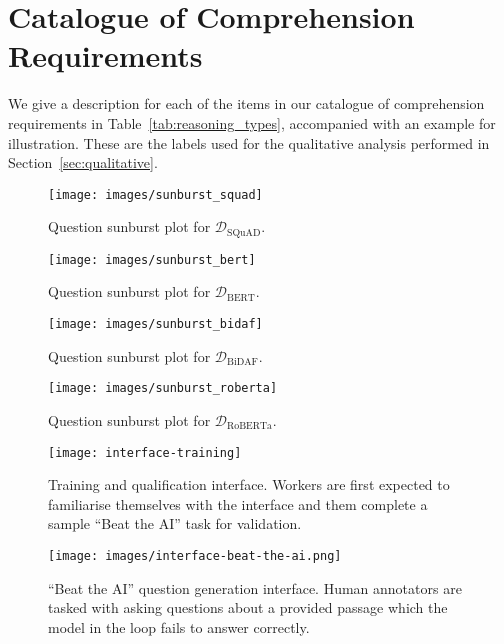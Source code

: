 \documentclass[11pt,a4paper]{article}
\newcommand{\dataset}[1]{\ensuremath{\mathcal{D_{\mathrm{#1}}}}}
\begin{document}
    \section{Catalogue of Comprehension Requirements}
    \label{sec:appendix_reasoning_types}
    We give a description for each of the items in our catalogue of comprehension requirements in Table~\ref{tab:reasoning_types}, accompanied with an example for illustration.
These are the labels used for the qualitative analysis  performed in Section~\ref{sec:qualitative}.
    
    
\begin{figure}[ht]
        \centering
        \texttt{[image: images/sunburst\_squad]}
        \caption{Question sunburst plot for \dataset{SQuAD}.}
        \label{fig:sunburst_squad}
    \end{figure}


    
    
\begin{figure}[ht]
        \centering
        \texttt{[image: images/sunburst\_bert]}
        \caption{Question sunburst plot for \dataset{BERT}.}
        \label{fig:sunburst_bert}
    \end{figure}


\begin{figure}[ht]
        \centering
        \texttt{[image: images/sunburst\_bidaf]}
        \caption{Question sunburst plot for \dataset{BiDAF}.}
        \label{fig:sunburst_bidaf}
    \end{figure}


\begin{figure}[ht]
        \centering
        \texttt{[image: images/sunburst\_roberta]}
        \caption{Question sunburst plot for \dataset{RoBERTa}.}
        \label{fig:sunburst_roberta}
    \end{figure}


    \clearpage
    
    
\begin{figure*}[h]
        \centering
        \texttt{[image: interface-training]}
        \caption{Training and qualification interface. Workers are first expected to familiarise themselves with the interface and them complete a sample ``Beat the AI'' task for validation.} 
        \label{fig:interface_training}
    \end{figure*}


\begin{figure*}[h]
        \centering
        \texttt{[image: images/interface-beat-the-ai.png]}
        \caption{``Beat the AI'' question generation interface. Human annotators are tasked with asking questions about a provided passage which the model in the loop fails to answer correctly.} 
        \label{fig:interface_question_generation_full}
    \end{figure*}
\end{document}
